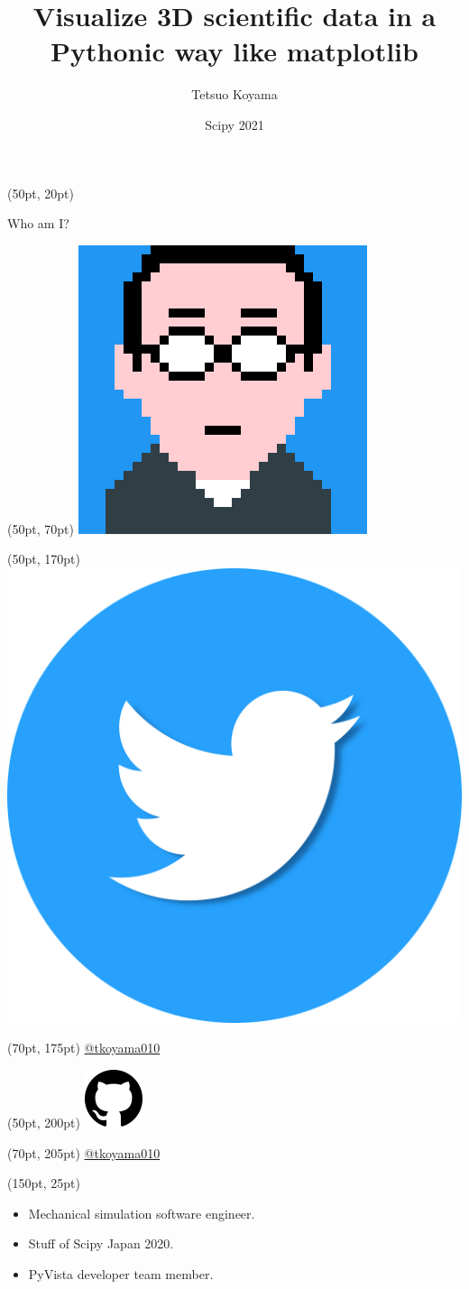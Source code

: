 \documentclass[aspectratio=169,12pt]{beamer}
\title{Visualize 3D scientific data in a Pythonic way like matplotlib}
\begin{document}
\author{Tetsuo Koyama}
\date{Scipy 2021}

\frame{\titlepage}

\begin{frame}[fragile]
\begin{textblock*}{350pt}(50pt, 20pt)
\begin{block}{Who am I?}
\end{block}
\end{textblock*}
\begin{textblock*}{350pt}(50pt, 70pt)
\includegraphics[width=0.25\linewidth]{tkoyama010.png}
\end{textblock*}
\begin{textblock*}{350pt}(50pt, 170pt)
\includegraphics[width=0.05\linewidth]{twitter-5662063_1280.png}
\end{textblock*}
\begin{textblock*}{350pt}(70pt, 175pt)
\href{https://twitter.com/tkoyama010}{@tkoyama010}
\end{textblock*}
\begin{textblock*}{350pt}(50pt, 200pt)
\includegraphics[width=0.05\linewidth]{github.png}
\end{textblock*}
\begin{textblock*}{350pt}(70pt, 205pt)
\href{https://github.com/tkoyama010}{@tkoyama010}
\end{textblock*}
\begin{textblock*}{350pt}(150pt, 25pt)
\begin{itemize}
\item {} Mechanical simulation software engineer.
\item {} Stuff of Scipy Japan 2020.
\item {} PyVista developer team member.

\end{itemize}
\end{textblock*}
\end{frame}
\end{document}
